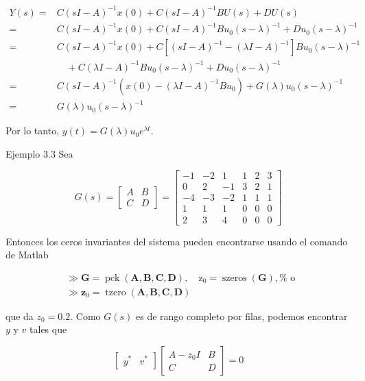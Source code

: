 \documentclass[11pt]{article}
\begin{document}
$$
\begin{aligned}
Y(s)= & C(s I-A)^{-1} x(0)+C(s I-A)^{-1} B U(s)+D U(s) \\
= & C(s I-A)^{-1} x(0)+C(s I-A)^{-1} B u_{0}(s-\lambda)^{-1}+D u_{0}(s-\lambda)^{-1} \\
= & C(s I-A)^{-1} x(0)+C\left[(s I-A)^{-1}-(\lambda I-A)^{-1}\right] B u_{0}(s-\lambda)^{-1} \\
& \quad+C(\lambda I-A)^{-1} B u_{0}(s-\lambda)^{-1}+D u_{0}(s-\lambda)^{-1} \\
= & C(s I-A)^{-1}\left(x(0)-(\lambda I-A)^{-1} B u_{0}\right)+G(\lambda) u_{0}(s-\lambda)^{-1} \\
= & G(\lambda) u_{0}(s-\lambda)^{-1}
\end{aligned}
$$

Por lo tanto, $y(t)=G(\lambda) u_{0} e^{\lambda t}$.

Ejemplo 3.3 Sea

$$
G(s)=\left[\begin{array}{c|c}
A & B \\
\hline C & D
\end{array}\right]=\left[\begin{array}{ccc|ccc}
-1 & -2 & 1 & 1 & 2 & 3 \\
0 & 2 & -1 & 3 & 2 & 1 \\
-4 & -3 & -2 & 1 & 1 & 1 \\
\hline 1 & 1 & 1 & 0 & 0 & 0 \\
2 & 3 & 4 & 0 & 0 & 0
\end{array}\right]
$$

Entonces los ceros invariantes del sistema pueden encontrarse usando el comando de Matlab

$$
\begin{aligned}
& \gg \mathbf{G}=\operatorname{pck}(\mathbf{A}, \mathbf{B}, \mathbf{C}, \mathbf{D}), \quad \mathrm{z}_{0}=\operatorname{szeros}(\mathbf{G}), \% \text { o } \\
& \gg \mathbf{z}_{0}=\operatorname{tzero}(\mathbf{A}, \mathbf{B}, \mathbf{C}, \mathbf{D})
\end{aligned}
$$

que da $z_{0}=0.2$. Como $G(s)$ es de rango completo por filas, podemos encontrar $y$ y $v$ tales que

$$
\left[\begin{array}{ll}
y^{*} & v^{*}
\end{array}\right]\left[\begin{array}{cc}
A-z_{0} I & B \\
C & D
\end{array}\right]=0
$$
\end{document}
